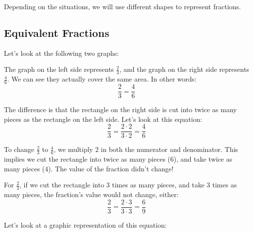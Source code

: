 Depending on the situations, we will use different shapes to represent fractions.

\subsection{Equivalent Fractions}
Let's look at the following two graphs:

\begin{center}
\end{center}

The graph on the left side represents $\frac{2}{3}$, and the graph on the right side represents $\frac{4}{6}$. We can see they actually cover the same area. In other words:
\[ \frac{2}{3}=\frac{4}{6} \]

The difference is that the rectangle on the right side is cut into twice as many pieces as the rectangle on the left side. Let's look at this equation:
\[ \frac{2}{3}=\frac{2\cdot2}{3\cdot2}=\frac{4}{6} \]

To change $\frac{2}{3}$ to $\frac{4}{6}$, we multiply $2$ in both the numerator and denominator. This implies we cut the rectangle into twice as many pieces ($6$), and take twice as many pieces ($4$). The value of the fraction didn't change!

For $\frac{2}{3}$, if we cut the rectangle into $3$ times as many pieces, and take $3$ times as many pieces, the fraction's value would not change, either:
\[ \frac{2}{3}=\frac{2\cdot3}{3\cdot3}=\frac{6}{9} \]

Let's look at a graphic representation of this equation:

